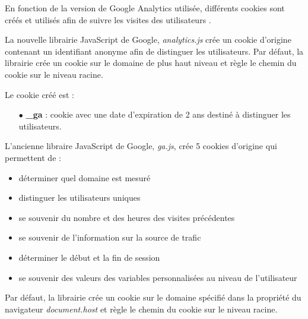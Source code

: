 En fonction de la version de Google Analytics utilisée, différents cookies sont créés et utilisés afin de suivre les visites des utilisateurs \cite{Google_Analytics_cookies}.
\newline

La nouvelle librairie JavaScript de Google, \textit{analytics.js} crée un cookie d'origine contenant un identifiant anonyme afin de distinguer les utilisateurs. Par défaut, la librairie crée un cookie sur le domaine de plus haut niveau et règle le chemin du cookie sur le niveau racine.
\newline

Le cookie créé est :
\begin{itemize}
  \item[$\bullet$] \textbf{\_ga} : cookie avec une date d'expiration de 2 ans destiné à distinguer les utilisateurs.
  \newline
\end{itemize}

L'ancienne libraire JavaScript de Google, \textit{ga.js}, crée 5 cookies d'origine qui permettent de :
\begin{itemize}
  \item déterminer quel domaine est mesuré
  \item distinguer les utilisateurs uniques
  \item se souvenir du nombre et des heures des visites précédentes
  \item se souvenir de l'information sur la source de trafic
  \item déterminer le début et la fin de session
  \item se souvenir des valeurs des variables personnalisées au niveau de l'utilisateur
  \newline
\end{itemize}

Par défaut, la librairie crée un cookie sur le domaine spécifié dans la propriété du navigateur \textit{document.host} et règle le chemin du cookie sur le niveau racine.
\newline

